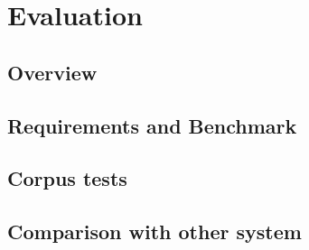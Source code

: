 \chapter{Evaluation}

\section{Overview}

\section{Requirements and Benchmark}

\section{Corpus tests}

\section{Comparison with other system}
